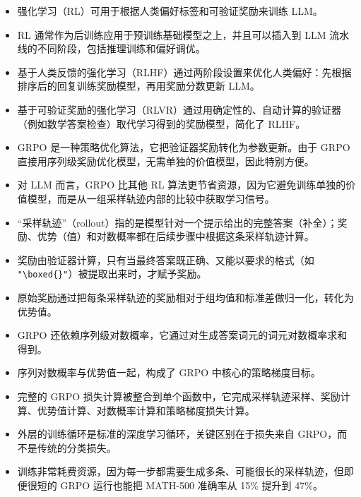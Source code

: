 \begin{itemize}
\item 强化学习（RL）可用于根据人类偏好标签和可验证奖励来训练 LLM。
\item RL 通常作为后训练应用于预训练基础模型之上，并且可以插入到 LLM 流水线的不同阶段，包括推理训练和偏好调优。
\item 基于人类反馈的强化学习（RLHF）通过两阶段设置来优化人类偏好：先根据排序后的回复训练奖励模型，再用奖励分数更新 LLM。
\item 基于可验证奖励的强化学习（RLVR）通过用确定性的、自动计算的验证器（例如数学答案检查）取代学习得到的奖励模型，简化了 RLHF。
\item GRPO 是一种策略优化算法，它把验证器奖励转化为参数更新。由于 GRPO 直接用序列级奖励优化模型，无需单独的价值模型，因此特别方便。
\item 对 LLM 而言，GRPO 比其他 RL 算法更节省资源，因为它避免训练单独的价值模型，而是从一组采样轨迹内部的比较中获取学习信号。
\item “采样轨迹”（rollout）指的是模型针对一个提示给出的完整答案（补全）；奖励、优势（值）和对数概率都在后续步骤中根据这条采样轨迹计算。
\item 奖励由验证器计算，只有当最终答案既正确、又能以要求的格式（如 \texttt{"}\texttt{\textbackslash boxed\{\}}\texttt{"}）被提取出来时，才赋予奖励。
\item 原始奖励通过把每条采样轨迹的奖励相对于组均值和标准差做归一化，转化为优势值。
\item GRPO 还依赖序列级对数概率，它通过对生成答案词元的词元对数概率求和得到。
\item 序列对数概率与优势值一起，构成了 GRPO 中核心的策略梯度目标。
\item 完整的 GRPO 损失计算被整合到单个函数中，它完成采样轨迹采样、奖励计算、优势值计算、对数概率计算和策略梯度损失计算。
\item 外层的训练循环是标准的深度学习循环，关键区别在于损失来自 GRPO，而不是传统的分类损失。
\item 训练非常耗费资源，因为每一步都需要生成多条、可能很长的采样轨迹，但即便很短的 GRPO 运行也能把 MATH-500 准确率从 15\% 提升到 47\%。
\end{itemize}
